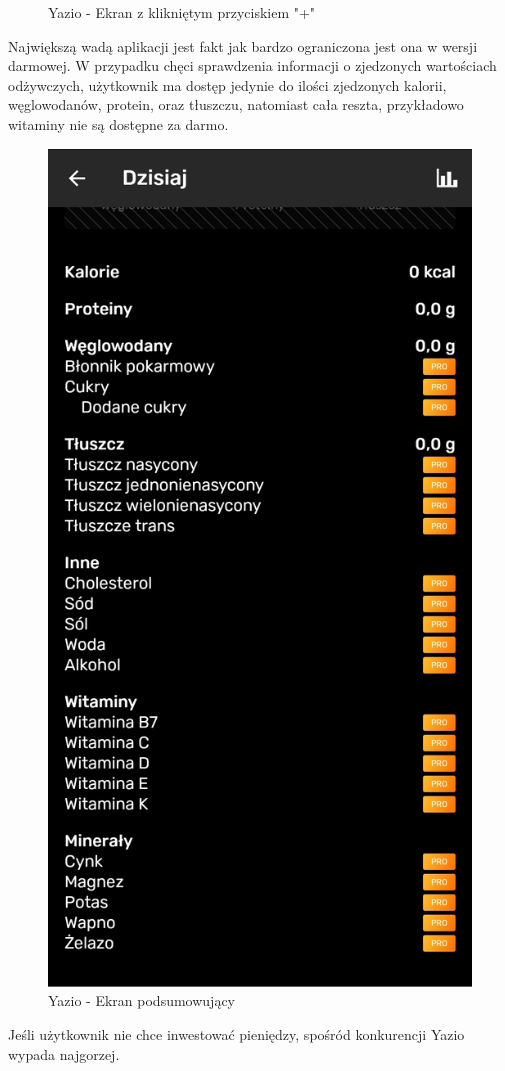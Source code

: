 \documentclass[12pt, a4paper]{article}
\begin{document}
\begin{sloppypar}
{{{\begin{itemize}
\begin{figure}[H]
          \caption{Yazio - Ekran z klikniętym przyciskiem "+"}
          \label{fig:yaz2}
        \end{figure}
      \end{itemize}
      Największą wadą aplikacji jest fakt jak bardzo ograniczona jest ona w wersji darmowej.
      W przypadku chęci sprawdzenia informacji o zjedzonych wartościach odżywczych, użytkownik
      ma dostęp jedynie do ilości zjedzonych kalorii, węglowodanów, protein, oraz tłuszczu,
      natomiast cała reszta, przykładowo witaminy nie są dostępne za darmo. 
      \begin{figure}[H]
        \centering
        \includegraphics[width=.3\textwidth]{yazio_3.jpg}
        \caption{Yazio - Ekran podsumowujący}
        \label{fig:yaz3}
      \end{figure}
      Jeśli użytkownik nie chce inwestować pieniędzy, spośród konkurencji Yazio wypada 
      najgorzej.
    }
}}
\end{sloppypar}
\end{document}
